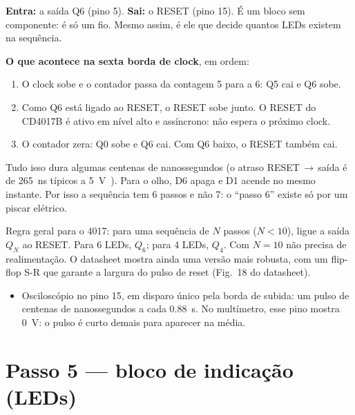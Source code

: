 \documentclass[11pt,a4paper]{article}
\begin{document}
\textbf{Entra:} a saída Q6 (pino 5). \textbf{Sai:} o RESET (pino 15). É um bloco sem
componente: é só um fio. Mesmo assim, é ele que decide quantos LEDs existem na sequência.

\textbf{O que acontece na sexta borda de clock}, em ordem:
\begin{enumerate}
  \item O clock sobe e o contador passa da contagem 5 para a 6: Q5 cai e Q6 sobe.
  \item Como Q6 está ligado ao RESET, o RESET sobe junto. O RESET do CD4017B é ativo em
  nível alto e assíncrono: não espera o próximo clock.
  \item O contador zera: Q0 sobe e Q6 cai. Com Q6 baixo, o RESET também cai.
\end{enumerate}
Tudo isso dura algumas centenas de nanossegundos (o atraso RESET\,$\to$\,saída é de
\SI{265}{\nano\second} típicos a \SI{5}{\volt}~\cite{cd4017}). Para o olho, D6 apaga e
D1 acende no mesmo instante. Por isso a sequência tem 6 passos e não 7: o “passo 6” existe
só por um piscar elétrico.

\begin{dicaprof}
Regra geral para o 4017: para uma sequência de $N$ passos ($N < 10$), ligue a saída
$Q_N$ ao RESET. Para 6 LEDs, $Q_6$; para 4 LEDs, $Q_4$. Com $N = 10$ não precisa
de realimentação. O datasheet mostra ainda uma versão mais robusta, com um flip-flop S-R
que garante a largura do pulso de reset (Fig.~18 do datasheet).
\end{dicaprof}

\begin{medir}
\begin{itemize}[leftmargin=*]
  \item Osciloscópio no pino 15, em disparo único pela borda de subida: um pulso de
  centenas de nanossegundos a cada \SI{0,88}{\second}. No multímetro, esse pino mostra
  \SI{0}{\volt}: o pulso é curto demais para aparecer na média.
\end{itemize}
\end{medir}

\section{Passo 5 — bloco de indicação (LEDs)}
\begin{figure}[H]
\centering
\diagramaBlocos[todosapagados, b5/.style={destaque}]
\end{figure}
\end{document}
